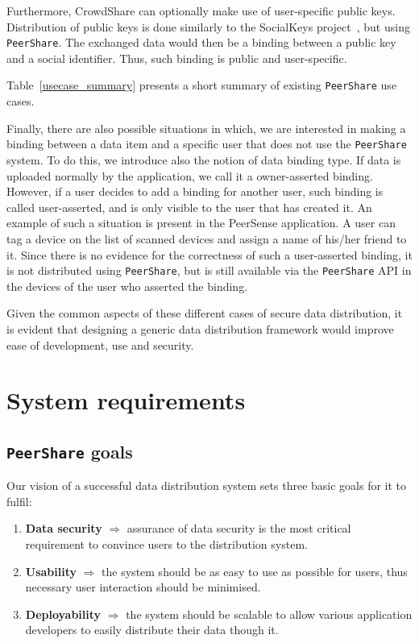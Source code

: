 \documentclass[twocolumn,a4paper,10pt]{article}
\newcommand{\peershare}{\texttt{PeerShare}\xspace}
\begin{document}
Furthermore, CrowdShare can optionally make use of user-specific public keys. Distribution of public keys is done similarly to the SocialKeys project~\cite{socialkeys}, but using \peershare. The exchanged data would then be a binding between a public key and a social identifier. Thus, such binding is public and user-specific.

Table~\ref{usecase_summary} presents a short summary of existing \peershare use cases.

Finally, there are also possible situations in which, we are interested in making a binding between a data item and a specific user that does not use the \peershare system. To do this, we introduce also the notion of data binding type. If data is uploaded normally by the application, we call it a owner-asserted binding. However, if a user decides to add a binding for another user, such binding is called user-asserted, and is only visible to the user that has created it. An example of such a situation is present in the PeerSense application. A user can tag a device on the list of scanned devices and assign a name of his/her friend to it. Since there is no evidence for the correctness of such a user-asserted binding, it is not distributed using \peershare, but is still available via the \peershare API in the devices of the user who asserted the binding.

Given the common aspects of these different cases of secure data distribution, it is evident that designing a generic data distribution framework would improve ease of development, use and security.

\section{System requirements}
\label{:requirements}
\subsection{\peershare goals}
Our vision of a successful data distribution system sets three basic goals for it to fulfil:
\begin{enumerate}
\item \textbf{Data security} $\Rightarrow$ assurance of data security is the most critical requirement to convince users to the distribution system. 
\item \textbf{Usability} $\Rightarrow$ the system should be as easy to use as possible for users, thus necessary user interaction should be minimised.
\item \textbf{Deployability} $\Rightarrow$ the system should be scalable to allow various application developers to easily distribute their data though it.
\end{enumerate}
\end{document}
